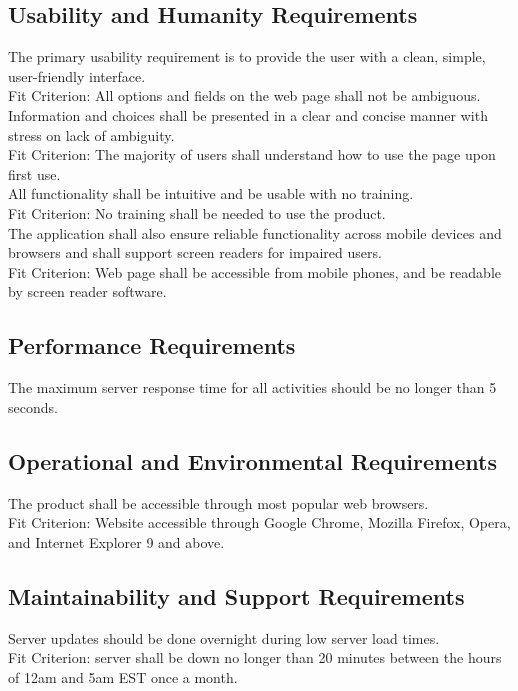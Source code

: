 \documentclass[12pt, titlepage]{article}
\begin{document}
\subsection{Usability and Humanity Requirements}
The primary usability requirement is to provide the user with a clean, simple, user-friendly interface.\\
Fit Criterion: All options and fields on the web page shall not be ambiguous.\\

\noindent Information and choices shall be presented in a clear and concise manner with stress on lack of ambiguity.\\
Fit Criterion: The majority of users shall understand how to use the page upon first use.\\

\noindent All functionality shall be intuitive and be usable with no training.\\
Fit Criterion: No training shall be needed to use the product.\\

\noindent The application shall also ensure reliable functionality across mobile devices and browsers and shall support screen readers for impaired users.\\
Fit Criterion: Web page shall be accessible from mobile phones, and be readable by screen reader software.

\subsection{Performance Requirements}
The maximum server response time for all activities should be no longer than 5 seconds.\\

\subsection{Operational and Environmental Requirements}
The product shall be accessible through most popular web browsers.\\
Fit Criterion: Website accessible through Google Chrome, Mozilla Firefox, Opera, and Internet Explorer 9 and above.\\

\subsection{Maintainability and Support Requirements}
Server updates should be done overnight during low server load times.\\
Fit Criterion: server shall be down no longer than 20 minutes between the hours of 12am and 5am EST once a month.
\end{document}
